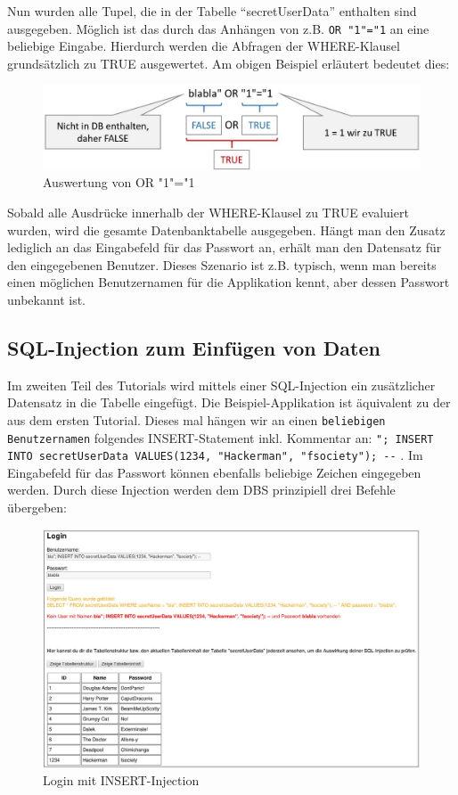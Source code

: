 Nun wurden alle Tupel, die in der Tabelle \enquote{secretUserData} enthalten sind ausgegeben. Möglich ist das durch das Anhängen von z.B. \colorbox{altgray}{\lstinline|OR "1"="1|} an eine beliebige Eingabe. Hierdurch werden die Abfragen der WHERE-Klausel grundsätzlich zu TRUE ausgewertet. Am obigen Beispiel erläutert bedeutet dies:
\begin{figure}[H]
	\centering
	\includegraphics[width=\textwidth]{images/SQL_Injection/or1is1.jpg}
	\caption{Auswertung von OR "1"="1}
	\label{fig:or1is1}
\end{figure}
Sobald alle Ausdrücke innerhalb der WHERE-Klausel zu TRUE evaluiert wurden, wird die gesamte Datenbanktabelle ausgegeben. Hängt man den Zusatz lediglich an das Eingabefeld für das Passwort an, erhält man den Datensatz für den eingegebenen Benutzer. Dieses Szenario ist z.B. typisch, wenn man bereits einen möglichen Benutzernamen für die Applikation kennt, aber dessen Passwort unbekannt ist.

\subsection{SQL-Injection zum Einfügen von Daten}
Im zweiten Teil des Tutorials wird mittels einer SQL-Injection ein zusätzlicher Datensatz in die Tabelle eingefügt. Die Beispiel-Applikation ist äquivalent zu der aus dem ersten Tutorial. Dieses mal hängen wir an einen \colorbox{altgray}{\lstinline|beliebigen Benutzernamen|} folgendes INSERT-Statement inkl. Kommentar an: \colorbox{altgray}{\lstinline|"; INSERT INTO secretUserData VALUES(1234, "Hackerman", "fsociety"); --|} . Im Eingabefeld für das Passwort können ebenfalls beliebige Zeichen eingegeben werden.
Durch diese Injection werden dem DBS prinzipiell drei Befehle übergeben:

\begin{figure}[H]
	\centering
	\includegraphics[width=\textwidth]{images/SQL_Injection/insert_injection.jpg}
	\caption{Login mit INSERT-Injection}
	\label{fig:insert_injection}
\end{figure}

